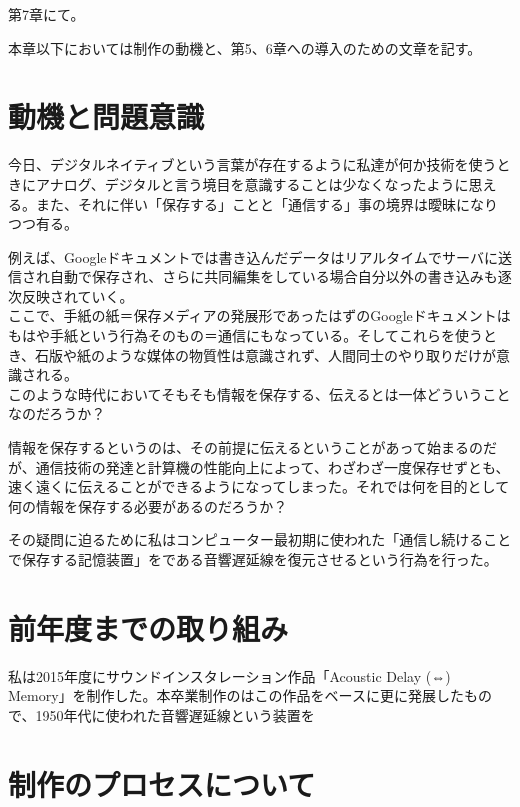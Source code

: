 第7章にて。

本章以下においては制作の動機と、第5、6章への導入のための文章を記す。

\section{動機と問題意識}\label{ux52d5ux6a5fux3068ux554fux984cux610fux8b58}

今日、デジタルネイティブという言葉が存在するように私達が何か技術を使うときにアナログ、デジタルと言う境目を意識することは少なくなったように思える。また、それに伴い「保存する」ことと「通信する」事の境界は曖昧になりつつ有る。

例えば、Googleドキュメントでは書き込んだデータはリアルタイムでサーバに送信され自動で保存され、さらに共同編集をしている場合自分以外の書き込みも逐次反映されていく。\\
ここで、手紙の紙＝保存メディアの発展形であったはずのGoogleドキュメントはもはや手紙という行為そのもの＝通信にもなっている。そしてこれらを使うとき、石版や紙のような媒体の物質性は意識されず、人間同士のやり取りだけが意識される。\\
このような時代においてそもそも情報を保存する、伝えるとは一体どういうことなのだろうか？

情報を保存するというのは、その前提に伝えるということがあって始まるのだが、通信技術の発達と計算機の性能向上によって、わざわざ一度保存せずとも、速く遠くに伝えることができるようになってしまった。それでは何を目的として何の情報を保存する必要があるのだろうか？

その疑問に迫るために私はコンピューター最初期に使われた「通信し続けることで保存する記憶装置」をである音響遅延線を復元させるという行為を行った。

\section{前年度までの取り組み}\label{ux524dux5e74ux5ea6ux307eux3067ux306eux53d6ux308aux7d44ux307f}

私は2015年度にサウンドインスタレーション作品「Acoustic Delay (⇔)
Memory」を制作した。本卒業制作のはこの作品をベースに更に発展したもので、1950年代に使われた音響遅延線という装置を

\section{制作のプロセスについて}\label{ux5236ux4f5cux306eux30d7ux30edux30bbux30b9ux306bux3064ux3044ux3066}

